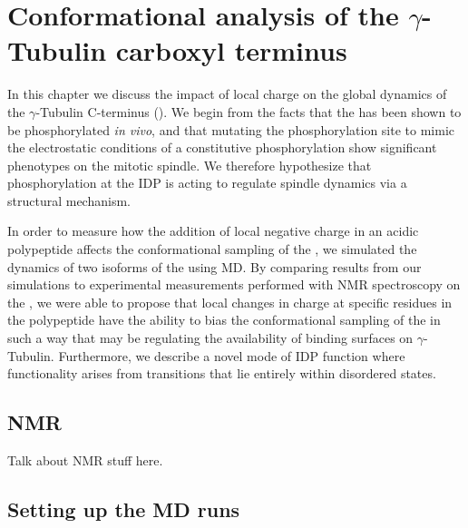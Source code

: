 \chapter{Conformational analysis of the $\gamma$-Tubulin carboxyl terminus}

In this chapter we discuss the impact of local charge on the global dynamics of the $\gamma$-Tubulin C-terminus (\gct{}). We begin from the facts that the \gct{} has been shown to be phosphorylated {\it in vivo}, and that mutating the phosphorylation site to mimic the electrostatic conditions of a constitutive phosphorylation show significant phenotypes on the mitotic spindle. We therefore hypothesize that phosphorylation at the \gct{} IDP is acting to regulate spindle dynamics via a structural mechanism.

In order to measure how the addition of local negative charge in an acidic polypeptide affects the conformational sampling of the \gct{}, we simulated the dynamics of two isoforms of the \gct{} using MD. By comparing results from our simulations to experimental measurements performed with NMR spectroscopy on the \gct{}, we were able to propose that local changes in charge at specific residues in the polypeptide have the ability to bias the conformational sampling of the \gct{} in such a way that may be regulating the availability of binding surfaces on $\gamma$-Tubulin. Furthermore, we describe a novel mode of IDP function where functionality arises from transitions that lie entirely within disordered states.

\section{NMR}
Talk about NMR stuff here.

\section{Setting up the MD runs}

